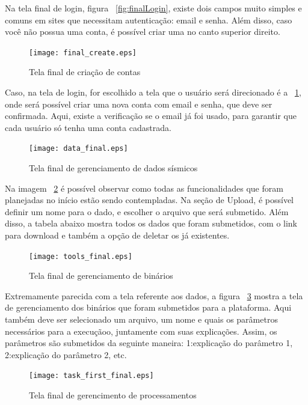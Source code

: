 \documentclass[11pt,twoside]{article}
\begin{document}
Na tela final de login, figura ~\ref{fig:finalLogin}, existe dois campos muito simples e comuns em sites que necessitam autenticação: email e senha. Além disso, caso você não possua uma conta, é possível criar uma no canto superior direito.

\begin{figure}[!h]
  \centering
  \texttt{[image: final\_create.eps]}
  \caption{Tela final de criação de contas}
  \label{fig:finalCreate}
\end{figure}

Caso, na tela de login, for escolhido a tela que o usuário será direcionado é a ~\ref{fig:finalCreate}, onde será possível criar uma nova conta com email e senha, que deve ser confirmada. Aqui, existe a verificação
se o email já foi usado, para garantir que cada usuário só tenha uma conta cadastrada.

\begin{figure}[!h]
  \centering
  \texttt{[image: data\_final.eps]}
  \caption{Tela final de gerenciamento de dados sísmicos}
  \label{fig:finalData}
\end{figure}

Na imagem ~\ref{fig:finalData} é possível observar como todas as funcionalidades que foram planejadas no início estão sendo contempladas. Na seção de Upload, é possível definir um nome para o dado, e escolher o 
arquivo que será submetido. Além disso, a tabela abaixo mostra todos os dados que foram submetidos, com o link para download e também a opção de deletar os já existentes.

\begin{figure}[!h]
  \centering
  \texttt{[image: tools\_final.eps]}
  \caption{Tela final de gerenciamento de binários}
  \label{fig:finalTools}
\end{figure}

Extremamente parecida com a tela referente aos dados, a figura ~\ref{fig:finalTools} mostra a tela de gerenciamento dos binários que foram submetidos para a plataforma. Aqui também deve
ser selecionado um arquivo, um nome e quais os parâmetros necessários para a execuçãoo, juntamente com suas explicações. Assim, os parâmetros são submetidos da seguinte maneira: 1:explicação do parâmetro 1,
2:explicação do parâmetro 2, etc.

\begin{figure}[!h]
  \centering
  \texttt{[image: task\_first\_final.eps]}
  \caption{Tela final de gerencimento de processamentos}
  \label{fig:finalTasks}
\end{figure}
\end{document}
